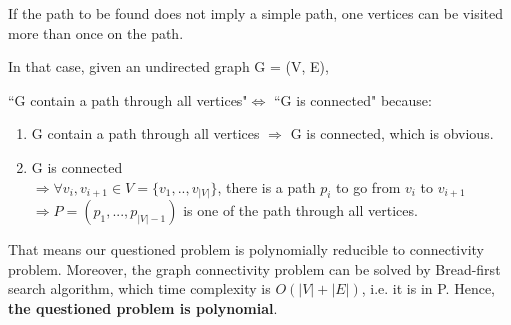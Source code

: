 \documentclass{article}
\begin{document}
If the path to be found does not imply a simple path, one vertices can be visited more than once on the path.

In that case, given an undirected graph G = (V, E),

``G contain a path through all vertices"$\Leftrightarrow$ ``G is connected" because:
\begin{enumerate}
    \item G contain a path through all vertices $\Rightarrow$ G is connected, which is obvious.
    \item G is connected \\ $\Rightarrow \forall v_i, v_{i+1} \in V = \{v_1,..,v_{|V|}\}$, there is a path $p_i$ to go from $v_i$ to $v_{i+1}$
    \\ $\Rightarrow P = (p_1,...,p_{|V|-1})$  is one of the path through all vertices.
\end{enumerate}

That means our questioned problem is polynomially reducible to connectivity problem. Moreover, the graph connectivity problem can be solved by Bread-first search algorithm, which time complexity is $O(|V|+|E|)$, i.e. it is in P. Hence, \textbf{the questioned problem is polynomial}.
\end{document}
